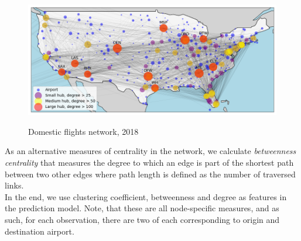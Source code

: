 \begin{figure}[H]
  \centering
  \caption{Domestic flights network, 2018}
    \includegraphics[width=1. \textwidth]{Exam/Figures/map_general_18}
    \vspace{-0.7cm}
  \label{fig:map_general_18}
\end{figure}
As an alternative measures of centrality in the network, we calculate \textit{betweenness centrality} that measures the degree to which an edge is part of the shortest path between two other edges where path length is defined as the number of traversed links. \\
In the end, we use clustering coefficient, betweenness and degree as features in the prediction model. Note, that these are all node-specific measures, and as such, for each observation, there are two of each corresponding to origin and destination airport. 

